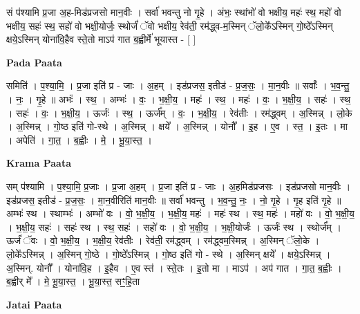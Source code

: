 \documentclass[17pt]{extarticle}
\begin{document}
सं प॑श्यामि प्र॒जा अ॒ह-मिड॑प्रजसो मान॒वीः । सर्वा॑ भवन्तु नो गृ॒हे । अंभः॒ स्थांभो॑ वो भक्षीय॒ महः॑ स्थ॒ महो॑ वो भक्षीय॒ सहः॑ स्थ॒ सहो॑ वो भक्षी॒योर्जः॒ स्थोर्जं॑ ॅवो भक्षीय॒ रेव॑ती॒ रम॑द्ध्व-म॒स्मिन् ॅलो॒के᳚ऽस्मिन् गो॒ष्ठे᳚ऽस्मिन् क्षये॒ऽस्मिन् योना॑वि॒हैव स्ते॒तो माऽप॑ गात ब॒ह्वीर्मे॑ भूयास्त - [ ] \newline

\textbf{Pada Paata} \newline

समिति॑ । प॒श्या॒मि॒ । प्र॒जा इति॑ प्र - जाः । अ॒हम् । इड॑प्रजस॒ इतीड॑ - प्र॒ज॒सः॒ । मा॒न॒वीः ॥ सर्वाः᳚ । भ॒व॒न्तु॒ । नः॒ । गृ॒हे ॥ अभंः॑ । स्थ॒ । अम्भः॑ । वः॒ । भ॒क्षी॒य॒ । महः॑ । स्थ॒ । महः॑ । वः॒ । भ॒क्षी॒य॒ । सहः॑ । स्थ॒ । सहः॑ । वः॒ । भ॒क्षी॒य॒ । ऊर्जः॑ । स्थ॒ । ऊर्ज᳚म् । वः॒ । भ॒क्षी॒य॒ । रेव॑तीः । रम॑द्ध्वम् । अ॒स्मिन्न् । लो॒के । अ॒स्मिन्न् । गो॒ष्ठ इति॑ गो-स्थे । अ॒स्मिन्न् । क्षये᳚ । अ॒स्मिन्न् । योनौ᳚ । इ॒ह । ए॒व । स्त॒ । इ॒तः । मा । अपेति॑ । गा॒त॒ । ब॒ह्वीः । मे॒ । भू॒या॒स्त॒ ।  \newline


\textbf{Krama Paata} \newline

सम् प॑श्यामि । प॒श्या॒मि॒ प्र॒जाः । प्र॒जा अ॒हम् । प्र॒जा इति॑ प्र - जाः । अ॒हमिड॑प्रजसः । इड॑प्रजसो मान॒वीः । इड॑प्रजस॒ इतीड॑ - प्र॒ज॒सः॒ । मा॒न॒वीरिति॑ मान॒वीः ॥ सर्वा॑ भवन्तु । भ॒व॒न्तु॒ नः॒ । नो॒ गृ॒हे । गृ॒ह इति॑ गृ॒हे ॥ अम्भः॑ स्थ । स्थाम्भः॑ । अम्भो॑ वः । वो॒ भ॒क्षी॒य॒ । भ॒क्षी॒य॒ महः॑ । महः॑ स्थ । स्थ॒ महः॑ । महो॑ वः । वो॒ भ॒क्षी॒य॒ । भ॒क्षी॒य॒ सहः॑ । सहः॑ स्थ । स्थ॒ सहः॑ । सहो॑ वः । वो॒ भ॒क्षी॒य॒ । भ॒क्षी॒योर्जः॑ । ऊर्जः॑ स्थ । स्थोर्ज᳚म् । ऊर्जं॑ ॅवः । वो॒ भ॒क्षी॒य॒ । भ॒क्षी॒य॒ रेव॑तीः । रेव॑ती॒ रम॑द्ध्वम् । रम॑द्ध्वम॒स्मिन्न् । अ॒स्मिन् ॅलो॒के । लो॒के᳚ऽस्मिन्न् । अ॒स्मिन् गो॒ष्ठे । गो॒ष्ठे᳚ऽस्मिन्न् । गो॒ष्ठ इति॑ गो - स्थे । अ॒स्मिन् क्षये᳚ । क्षये॒ऽस्मिन्न् । अ॒स्मिन्. योनौ᳚ । योना॑वि॒ह । इ॒हैव । ए॒व स्त॑ । स्ते॒तः । इ॒तो मा । माऽप॑ । अप॑ गात । गा॒त॒ ब॒ह्वीः । ब॒ह्वीर् मे᳚ । मे॒ भू॒या॒स्त॒ । भू॒या॒स्त॒ सꣳ॒॒हि॒ता \newline

\textbf{Jatai Paata} \newline
\end{document}
